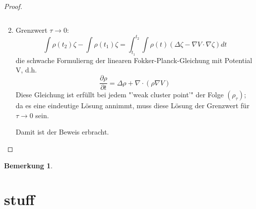 \documentclass[11pt,a4paper,notitlepage]{scrreprt}
\newtheorem{bem}[defi]{Bemerkung}
\begin{document}
\begin{proof}
\begin{enumerate}
\begin{equation}
\end{equation}
\item Grenzwert $\tau\to 0$:
\begin{equation}
\int\rho(t_2)\zeta-\int\rho(t_1)\zeta=\int_{t_1}^{t_2}\int\rho(t)(\Delta\zeta-\nabla V\cdot\nabla\zeta)dt
\end{equation}
die schwache Formulierng der linearen Fokker-Planck-Gleichung mit Potential V, d.h.
\begin{equation}
\dfrac{\partial\rho}{\partial t}=\Delta\rho+\nabla\cdot(\rho\nabla V)
\end{equation}
Diese Gleichung ist erfüllt bei jedem "'weak cluster point'" der Folge $(\rho_\tau)$; da es eine eindeutige Lösung annimmt, muss diese Lösung der Grenzwert für $\tau\to 0$ sein.

Damit ist der Beweis erbracht.
\end{enumerate}
\end{proof}

\begin{bem}
\end{bem}

\section{stuff}
\end{document}
